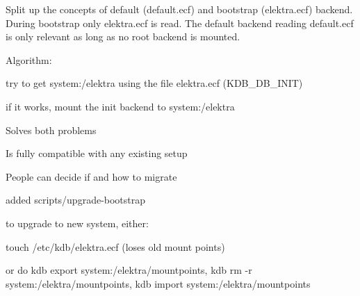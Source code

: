 Split up the concepts of default ({\ttfamily default.\+ecf}) and bootstrap ({\ttfamily elektra.\+ecf}) backend. During bootstrap only {\ttfamily elektra.\+ecf} is read. The default backend reading {\ttfamily default.\+ecf} is only relevant as long as no root backend is mounted.

Algorithm\+:


\begin{DoxyEnumerate}
\item try to get system\+:/elektra using the file elektra.\+ecf (K\+D\+B\+\_\+\+D\+B\+\_\+\+I\+N\+IT)
\item if it works, mount the init backend to system\+:/elektra
\end{DoxyEnumerate}


\begin{DoxyItemize}
\item Solves both problems
\item Is fully compatible with any existing setup
\item People can decide if and how to migrate
\end{DoxyItemize}


\begin{DoxyItemize}
\item added scripts/upgrade-\/bootstrap
\end{DoxyItemize}

to upgrade to new system, either\+:


\begin{DoxyItemize}
\item touch /etc/kdb/elektra.ecf (loses old mount points)
\item or do kdb export system\+:/elektra/mountpoints, kdb rm -\/r system\+:/elektra/mountpoints, kdb import system\+:/elektra/mountpoints 
\end{DoxyItemize}